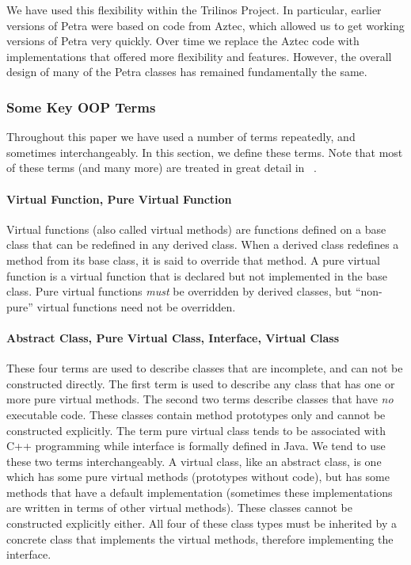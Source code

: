 \documentclass[12pt,relax]{SANDreport}
\begin{document}
We have used this flexibility within the Trilinos Project.  In particular, earlier versions
of Petra were based on code from Aztec, which allowed us to get working versions of Petra
very quickly.  Over time we replace the Aztec code with implementations that offered more
flexibility and features.  However, the overall design of many of the Petra classes has
remained fundamentally the same.

\subsubsection{Some Key OOP Terms}
Throughout this paper we have used a number of terms repeatedly, and sometimes
interchangeably. In this section, we define these terms. Note that most of
these terms (and many more) are treated in great detail in ~\cite{Stroustrup}.

\paragraph{Virtual Function, Pure Virtual Function}
Virtual functions (also called virtual methods) are functions defined on a
base class that can be redefined in any derived class. When a derived class
redefines a method from its base class, it is said to override that method.
A pure virtual function is a virtual function that is declared but not
implemented in the base class. Pure virtual functions {\it must} be overridden
by derived classes, but ``non-pure'' virtual functions need not be overridden.

\paragraph{Abstract Class, Pure Virtual Class, Interface, Virtual Class}  
These four terms are used to describe classes that are incomplete, and can not
be constructed directly.  The first term is used to describe any class that has
one or more pure virtual methods.  The second two terms describe classes that
have {\it no} executable code.  These classes contain method prototypes only
and cannot be constructed explicitly.  The term pure virtual class tends to be
associated with C++ programming while interface is formally defined in Java.
We tend to use these two terms interchangeably.  A virtual class, like an
abstract class, is one which has some pure virtual methods (prototypes without
code), but has some methods that have a default implementation (sometimes these
implementations are written in terms of other virtual methods).  These
classes cannot be constructed explicitly either.  All four of these class types
must be inherited by a concrete class that implements the virtual
methods, therefore implementing the interface.
\end{document}
